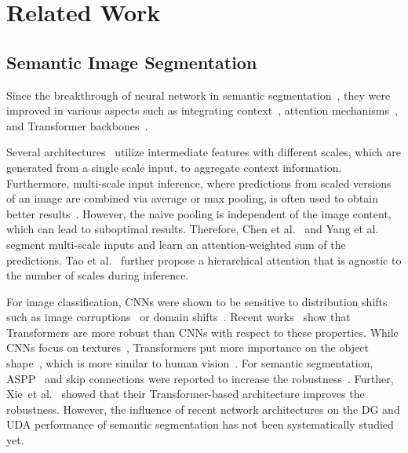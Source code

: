 \documentclass[journal,compsoc]{IEEEtran}
\begin{document}
 
\section{Related Work}
\label{sec:related_work}

\subsection{Semantic Image Segmentation}

Since the breakthrough of neural network in semantic segmentation~\cite{long2015fully}, they were improved in various aspects such as integrating context~\cite{chen2018encoder,zhang2018context,hoyer2019grid,yuan2020object}, attention mechanisms~\cite{wang2018non,fu2019dual}, and Transformer backbones~\cite{vaswani2017attention, xie2021segformer}.

Several architectures~\cite{chen2017deeplab,chen2018encoder,lin2019zigzagnet} utilize intermediate features with different scales, which are generated from a single scale input, to aggregate context information. 
Furthermore, multi-scale input inference, where predictions from scaled versions of an image are combined via average or max pooling, is often used to obtain better results~\cite{chen2018encoder,xie2021segformer}. However, the naive pooling is independent of the image content, which can lead to suboptimal results. Therefore, Chen et al.~\cite{chen2016attention} and Yang et al.~\cite{yang2018attention} segment multi-scale inputs and learn an attention-weighted sum of the predictions. Tao et al.~\cite{tao2020hierarchical} further propose a hierarchical attention that is agnostic to the number of scales during inference. 

For image classification, CNNs were shown to be sensitive to distribution shifts such as image corruptions~\cite{hendrycks2018benchmarking} or domain shifts~\cite{hendrycks2021many}. Recent works~\cite{bhojanapalli2021understanding, naseer2021intriguing} show that Transformers are more robust than CNNs with respect to these properties. While CNNs focus on textures~\cite{geirhos2018imagenet}, Transformers put more importance on the object shape~\cite{bhojanapalli2021understanding, naseer2021intriguing}, which is more similar to human vision~\cite{geirhos2018imagenet}.
For semantic segmentation, ASPP~\cite{chen2018encoder} and skip connections were reported to increase the robustness~\cite{kamann2021benchmarking}. Further, Xie~et al.~\cite{xie2021segformer} showed that their Transformer-based architecture improves the robustness.
However, the influence of recent network architectures on the DG and UDA performance of semantic segmentation has not been systematically studied yet.
\end{document}
